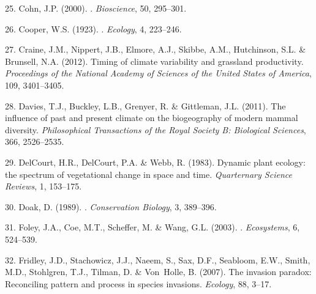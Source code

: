 \documentclass[11pt,a4paper,oneside]{article}
\begin{document}
\begin{thebibliography}{79}
25. Cohn, J.P. (2000).
.
\newblock \emph{Bioscience}, 50, 295--301.

26. Cooper, W.S. (1923).
.
\newblock \emph{Ecology}, 4, 223--246.

27. Craine, J.M., Nippert, J.B., Elmore, A.J., Skibbe, A.M., Hutchinson, S.L. \&
  Brunsell, N.A. (2012).
\newblock Timing of climate variability and grassland productivity.
\newblock \emph{Proceedings of the National Academy of Sciences of the United
  States of America}, 109, 3401--3405.

28. Davies, T.J., Buckley, L.B., Grenyer, R. \& Gittleman, J.L. (2011).
\newblock The influence of past and present climate on the biogeography of
  modern mammal diversity.
\newblock \emph{Philosophical Transactions of the Royal Society B: Biological
  Sciences}, 366, 2526--2535.

29. DelCourt, H.R., DelCourt, P.A. \& Webb, R. (1983).
\newblock Dynamic plant ecology: the spectrum of vegetational change in space
  and time.
\newblock \emph{Quarternary Science Reviews}, 1, 153--175.

30. Doak, D. (1989).
.
\newblock \emph{Conservation Biology}, 3, 389--396.

31. Foley, J.A., Coe, M.T., Scheffer, M. \& Wang, G.L. (2003).
.
\newblock \emph{Ecosystems}, 6, 524--539.

32. Fridley, J.D., Stachowicz, J.J., Naeem, S., Sax, D.F., Seabloom, E.W., Smith,
  M.D., Stohlgren, T.J., Tilman, D. \& Von~Holle, B. (2007).
\newblock The invasion paradox: Reconciling pattern and process in species
  invasions.
\newblock \emph{Ecology}, 88, 3--17.


\end{thebibliography}
\end{document}

